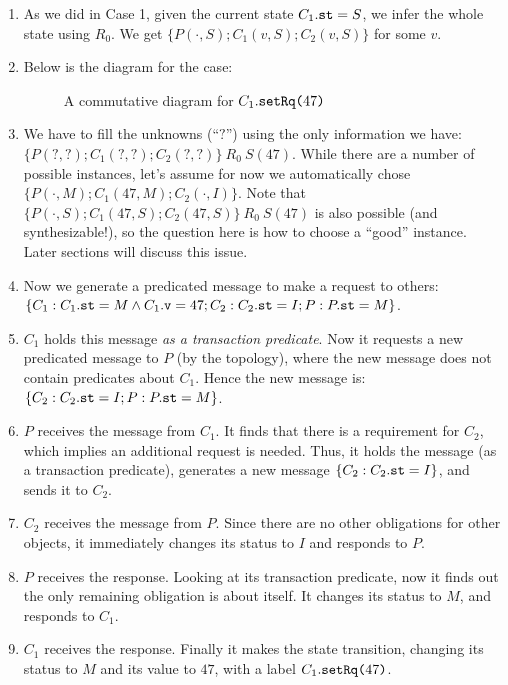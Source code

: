 \documentclass[format=manuscript]{acmart}
\begin{document}
\begin{enumerate}
\item As we did in Case 1, given the current state $C_1.\texttt{st} = S$, we infer
  the whole state using $R_0$. We get $\{ P(\cdot, S); C_1(v, S); C_2(v, S) \}$
  for some $v$.
\item Below is the diagram for the case:
  \begin{figure}[h]
    \caption{A commutative diagram for $C_1.\texttt{setRq(}47\texttt{)}$}
    \label{fig:comm-diagram-setrq}
  \end{figure}
\item We have to fill the unknowns (``$?$'') using the only information we have:
  $\{ P(?, ?); C_1(?, ?); C_2(?, ?) \}\ R_0\ S(47)$. While there are a number of
  possible instances, let's assume for now we automatically chose $\{ P(\cdot,
  M); C_1(47, M); C_2(\cdot, I) \}$. Note that $\{ P(\cdot, S); C_1(47, S);
  C_2(47, S) \}\ R_0\ S(47)$ is also possible (and synthesizable!), so the
  question here is how to choose a ``good'' instance. Later sections will discuss
  this issue.
\item Now we generate a predicated message to make a request to others: $\{ C_1:
  C_1.\texttt{st} = M \wedge C_1.\texttt{v} = 47; C_2: C_2.\texttt{st} = I; P: P.\texttt{st} = M
  \}$.
\item $C_1$ holds this message \emph{as a transaction predicate}. Now it
  requests a new predicated message to $P$ (by the topology), where the new
  message does not contain predicates about $C_1$. Hence the new message is: $\{
  C_2: C_2.\texttt{st} = I; P: P.\texttt{st} = M \}$.
\item $P$ receives the message from $C_1$. It finds that there is a requirement
  for $C_2$, which implies an additional request is needed. Thus, it holds the
  message (as a transaction predicate), generates a new message $\{ C_2:
  C_2.\texttt{st} = I \}$, and sends it to $C_2$.
\item $C_2$ receives the message from $P$. Since there are no other obligations
  for other objects, it immediately changes its status to $I$ and responds to
  $P$.
\item $P$ receives the response. Looking at its transaction predicate, now it
  finds out the only remaining obligation is about itself. It changes its status
  to $M$, and responds to $C_1$.
\item $C_1$ receives the response. Finally it makes the state transition,
  changing its status to $M$ and its value to $47$, with a label
  $C_1.\texttt{setRq(}47\texttt{)}$.
\end{enumerate}
\end{document}
